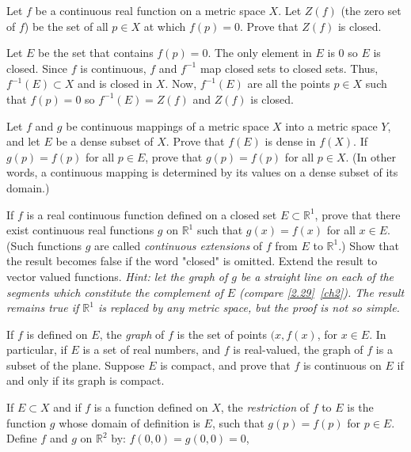 \begin{exercise}
\item
  Let \(f\) be a continuous real function on a metric space \(X\).
  Let \(Z(f)\) (the zero set of \(f\)) be the set of all \(p\in X\) at which
  \(f(p) = 0\).
  Prove that \(Z(f)\) is closed.
  \par\smallskip
  Let \(E\) be the set that contains \(f(p) = 0\).
  The only element in \(E\) is \(0\) so \(E\) is closed.
  Since \(f\) is continuous, \(f\) and \(f^{-1}\) map closed sets to closed
  sets.
  Thus, \(f^{-1}(E)\subset X\) and is closed in \(X\).
  Now, \(f^{-1}(E)\) are all the points \(p\in X\) such that \(f(p) = 0\) so
  \(f^{-1}(E) = Z(f)\) and \(Z(f)\) is closed.
\item
  \label{4.4}
  Let \(f\) and \(g\) be continuous mappings of a metric space \(X\) into a
  metric space \(Y\), and let \(E\) be a dense subset of \(X\).
  Prove that \(f(E)\) is dense in \(f(X)\).
  If \(g(p) = f(p)\) for all \(p\in E\), prove that \(g(p) = f(p)\) for all
  \(p\in X\).
  (In other words, a continuous mapping is determined by its values on a dense
  subset of its domain.)
\item
  \label{4.5}
  If \(f\) is a real continuous function defined on a closed set
  \(E\subset\mathbb{R}^1\), prove that there exist continuous real functions
  \(g\) on \(\mathbb{R}^1\) such that \(g(x) = f(x)\) for all \(x\in E\).
  (Such functions \(g\) are called \textit{continuous extensions} of \(f\) from
  \(E\) to \(\mathbb{R}^1\).)
  Show that the result becomes false if the word "closed" is omitted.
  Extend the result to vector valued functions.
  \textit{Hint: let the graph of \(g\) be a straight line on each of the
    segments which constitute the complement of \(E\) (compare
    \cref{2.29}~\cref{ch2}).
    The result remains true if \(\mathbb{R}^1\) is replaced by any metric
    space, but the proof is not so simple.}
\item
  If \(f\) is defined on \(E\), the \textit{graph} of \(f\) is the set of
  points \((x,f(x)\), for \(x\in E\).
  In particular, if \(E\) is a set of real numbers, and \(f\) is real-valued,
  the graph of \(f\) is a subset of the plane.
  Suppose \(E\) is compact, and prove that \(f\) is continuous on \(E\) if and
  only if its graph is compact.
\item
  If \(E\subset X\) and if \(f\) is a function defined on \(X\), the
  \textit{restriction} of \(f\) to \(E\) is the function \(g\) whose domain of
  definition is \(E\), such that \(g(p) = f(p)\) for \(p\in E\).
  Define \(f\) and \(g\) on \(\mathbb{R}^2\) by: \(f(0,0) = g(0,0) = 0\),

\end{exercise}
